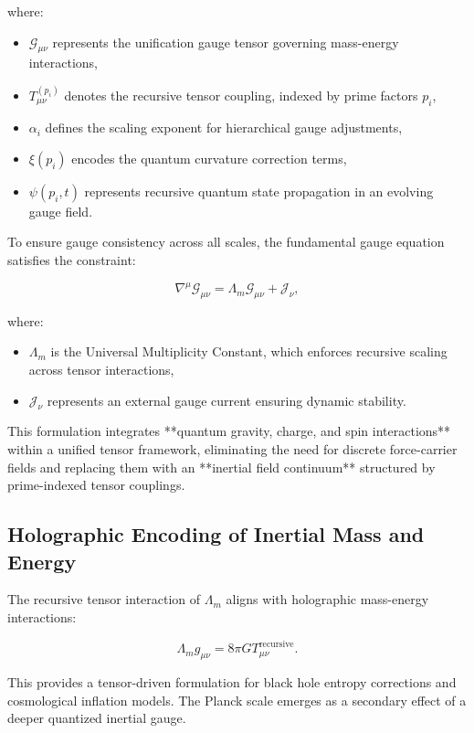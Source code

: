 \documentclass{article}
\theoremstyle{plain}
\begin{document}
\begin{itemize}
\begin{itemize}
where:
\begin{itemize}
    \item $\mathcal{G}_{\mu\nu}$ represents the unification gauge tensor governing mass-energy interactions,
    \item $T_{\mu\nu}^{(p_i)}$ denotes the recursive tensor coupling, indexed by prime factors $p_i$,
    \item $\alpha_i$ defines the scaling exponent for hierarchical gauge adjustments,
    \item $\xi(p_i)$ encodes the quantum curvature correction terms,
    \item $\psi(p_i, t)$ represents recursive quantum state propagation in an evolving gauge field.
\end{itemize}

To ensure gauge consistency across all scales, the fundamental gauge equation satisfies the constraint:

\begin{equation}
    \nabla^\mu \mathcal{G}_{\mu\nu} = \Lambda_m \mathcal{G}_{\mu\nu} + \mathcal{J}_\nu,
\end{equation}

where:
\begin{itemize}
    \item $\Lambda_m$ is the Universal Multiplicity Constant, which enforces recursive scaling across tensor interactions,
    \item $\mathcal{J}_\nu$ represents an external gauge current ensuring dynamic stability.
\end{itemize}

This formulation integrates **quantum gravity, charge, and spin interactions** within a unified tensor framework, eliminating the need for discrete force-carrier fields and replacing them with an **inertial field continuum** structured by prime-indexed tensor couplings.


\subsection{Holographic Encoding of Inertial Mass and Energy}

The recursive tensor interaction of $\Lambda_m$ aligns with holographic mass-energy interactions:

\begin{equation}
    \Lambda_m g_{\mu\nu} = 8\pi G T_{\mu\nu}^{\text{recursive}}.
\end{equation}

This provides a tensor-driven formulation for black hole entropy corrections and cosmological inflation models. The Planck scale emerges as a secondary effect of a deeper quantized inertial gauge.


\end{itemize}
\end{itemize}
\end{document}
